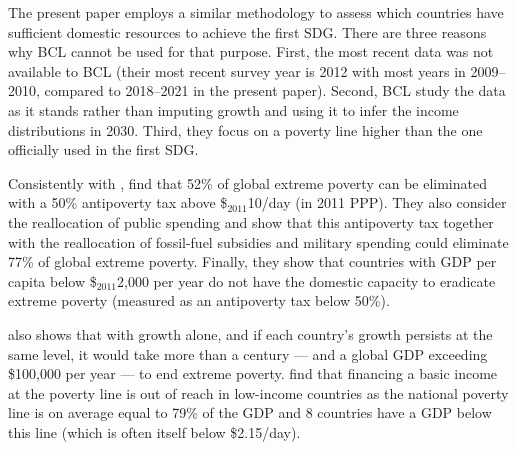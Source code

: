 The present paper employs a similar methodology to assess which countries have sufficient domestic resources to achieve the first SDG. There are three reasons why BCL cannot be used %
for that purpose. 
First, the most recent data was not available to BCL (their most recent survey year is 2012 with most years in 2009--2010, compared to 2018--2021 in the present paper). %
Second, BCL study the data as it stands rather than imputing growth and using it to infer the income distributions in 2030. Third, they focus on a poverty line higher than the one officially used in the first SDG.

Consistently with \cite{ravallion_poorer_2010}, \cite{hoy_gasoline_2016} find that 52\% of global extreme poverty can be eliminated with a 50\% antipoverty tax above \$$_\text{2011}$10/day (in 2011 PPP). They also consider the reallocation of public spending and show that this antipoverty tax together with the reallocation of fossil-fuel subsidies and military spending could eliminate 77\% of global extreme poverty. Finally, they show that countries with GDP per capita below \$$_\text{2011}$2,000 per year do not have the domestic capacity to eradicate extreme poverty (measured as an antipoverty tax below 50\%).

\cite{woodward_incrementum_2015} also shows that with growth alone, and if each country's growth persists at the same level, it would take more than a century --- and a global GDP exceeding \$100,000 per year --- to end extreme poverty. %
\cite{ortiz_universal_2018} find that financing a basic income at the poverty line is out of reach in low-income countries as the national poverty line is on average equal to 79\% of the GDP and 8 countries have a GDP below this line (which is often itself below \$2.15/day).

